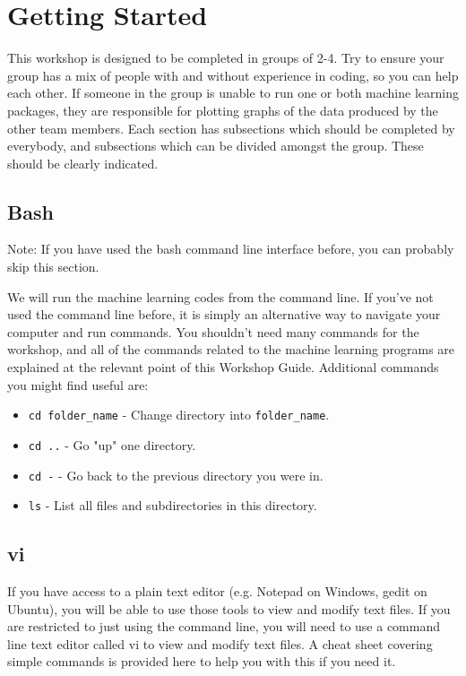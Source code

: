 \documentclass{article}
\begin{document}
\section{Getting Started}

This workshop is designed to be completed in groups of 2-4. Try to ensure your group has a mix of people with and without experience in coding, so you can help each other. If someone in the group is unable to run one or both machine learning packages, they are responsible for plotting graphs of the data produced by the other team members. Each section has subsections which should be completed by everybody, and subsections which can be divided amongst the group. These should be clearly indicated.

\subsection{Bash}
Note: If you have used the bash command line interface before, you can probably skip this section.

We will run the machine learning codes from the command line. If you've not used the command line before, it is simply an alternative way to navigate your computer and run commands. You shouldn't need many commands for the workshop, and all of the commands related to the machine learning programs are explained at the relevant point of this Workshop Guide. Additional commands you might find useful are:

\begin{itemize}

\item \verb|cd folder_name| - Change directory into \verb|folder_name|.
\item \verb|cd ..| - Go "up" one directory.
\item \verb|cd -| - Go back to the previous directory you were in.
\item \verb|ls| - List all files and subdirectories in this directory.

\end{itemize}

\subsection{vi}

If you have access to a plain text editor (e.g. Notepad on Windows, gedit on Ubuntu), you will be able to use those tools to view and modify text files. If you are restricted to just using the command line, you will need to use a command line text editor called vi to view and modify text files. A cheat sheet covering simple commands is provided here to help you with this if you need it.
\end{document}
